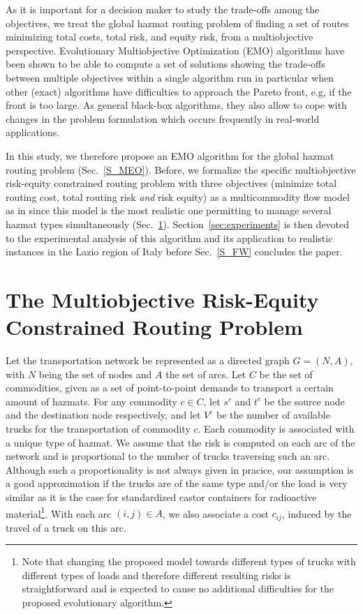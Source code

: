 \documentclass[preprint,12pt]{elsarticle}
\begin{document}
As it is important for a decision maker to study the trade-offs among the objectives, we treat the global hazmat routing problem of finding a set of routes minimizing total costs, total risk, and equity risk, from a multiobjective perspective. Evolutionary Multiobjective Optimization (EMO) algorithms have been shown to be able to compute a set of solutions showing the trade-offs between multiple objectives within a single algorithm run in particular when other (exact) algorithms have difficulties to approach the Pareto front, e.g, if the front is too large. As general black-box algorithms, they also allow to cope with changes in the problem formulation which occurs frequently in real-world applications.

In this study, we therefore propose an EMO algorithm for the global hazmat routing problem (Sec.~\ref{S_MEO}). Before, we formalize the specific multiobjective risk-equity constrained routing problem with three objectives (minimize total routing cost, total routing risk {\em and} risk equity) as a multicommodity flow model as in \cite{cd2008a} since this model is the most realistic one permitting to manage several hazmat types simultaneously (Sec.~\ref{S_RECRP}). Section~\ref{sec:experiments} is then devoted to the experimental analysis of this algorithm and its application to realistic instances in the Lazio region of Italy before Sec.~\ref{S_FW} concludes the paper.



\section{The Multiobjective Risk-Equity Constrained Routing Problem} \label{S_RECRP}

Let the transportation network be represented as a directed graph $G = (N, A)$, with $N$ being the set of nodes and $A$ the set of arcs. Let $C$ be the set of commodities, given as a set of point-to-point demands to transport a certain amount of hazmats. For any commodity $c\in C$, let $s^c$ and $t^c$ be the source node and the destination node respectively, and let $V^c$ be the number of available trucks for the transportation of commodity $c$. Each commodity is associated with a unique type of hazmat. We assume that the risk is computed on each arc of the network and is proportional to the number of trucks traversing such an arc. Although such a proportionality is not always given in pracice, our assumption is a good approximation if the trucks are of the same type and/or the load is very similar as it is the case for standardized castor containers for radioactive material\footnote{Note that changing the proposed model towards different types of trucks with different types of loads and therefore different resulting risks is straightforward and is expected to cause no additional difficulties for the proposed evolutionary algorithm.}. With each arc $(i,j) \in A$, we also associate a cost $c_{ij}$, induced by the travel of a truck on this arc.
\end{document}
